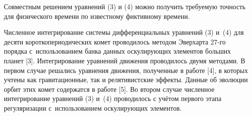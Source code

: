 Совместным решением уравнений (3) и (4) можно получить требуемую точность для физического времени по известному фиктивному времени.

Численное интегрирование системы дифференциальных уравнений (3) и~(4) для десяти короткопериодических комет проводилось методом Эверхарта 27-го порядка с~использованием банка данных оскулирующих элементов больших планет [3]. Интегрирование уравнений движения проводилось двумя методами. В первом случае решались уравнения движения, полученные в работе [4], в которых учтены как гравитационные, так  и релятивистские эффекты. Данные об эволюции орбит этих комет содержатся в работе [5]. Во втором случае численное интегрирование уравнений (3) и~(4) проводилось с учётом первого этапа регуляризации с~использованием оскулирующих элементов.



